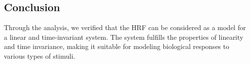 \documentclass[10pt]{article}
\theoremstyle{definition}
\theoremstyle{remark}
\theoremstyle{definition}
\numberwithin{equation}{prob}
\begin{document}
\subsection*{Conclusion}
Through the analysis, we verified that the HRF can be considered as a model for a linear and time-invariant system. The system fulfills the properties of linearity and time invariance, making it suitable for modeling biological responses to various types of stimuli.
\end{document}
